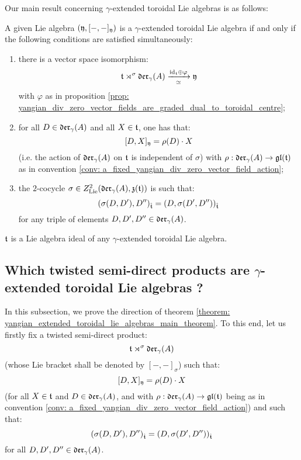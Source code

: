         Our main result concerning $\gamma$-extended toroidal Lie algebras is as follows:
        \begin{theorem} \label{theorem: yangian_extended_toroidal_lie_algebras_main_theorem}
            A given Lie algebra $(\mathfrak{y}, [-, -]_{\mathfrak{y}})$ is a $\gamma$-extended toroidal Lie algebra if and only if the following conditions are satisfied simultaneously:
            \begin{enumerate}
                \item there is a vector space isomorphism:
                    $$\mathfrak{t} \rtimes^{\sigma} \mathfrak{der}_{\gamma}(A) \xrightarrow[\simeq]{\mathrm{id}_{\mathfrak{t}} \oplus \varphi} \mathfrak{y}$$
                with $\varphi$ as in proposition \ref{prop: yangian_div_zero_vector_fields_are_graded_dual_to_toroidal_centre};
                \item for all $D \in \mathfrak{der}_{\gamma}(A)$ and all $X \in \mathfrak{t}$, one has that:
                    $$[D, X]_{\mathfrak{y}} = \rho(D) \cdot X$$
                (i.e. the action of $\mathfrak{der}_{\gamma}(A)$ on $\mathfrak{t}$ is independent of $\sigma$) with $\rho: \mathfrak{der}_{\gamma}(A) \to \mathfrak{gl}(\mathfrak{t})$ as in convention \ref{conv: a_fixed_yangian_div_zero_vector_field_action};

                \item the $2$-cocycle $\sigma \in Z^2_{\mathrm{Lie}}(\mathfrak{der}_{\gamma}(A), \mathfrak{z}(\mathfrak{t}))$ is such that:
                    $$(\sigma(D, D'), D'')_{\hat{\mathfrak{t}}} = (D, \sigma(D', D''))_{\hat{\mathfrak{t}}}$$
                for any triple of elements $D, D', D'' \in \mathfrak{der}_{\gamma}(A)$. 
            \end{enumerate}
        \end{theorem}
        \begin{corollary}
            $\mathfrak{t}$ is a Lie algebra ideal of any $\gamma$-extended toroidal Lie algebra.
        \end{corollary}

    \subsection{Which twisted semi-direct products are \texorpdfstring{$\gamma$}{}-extended toroidal Lie algebras ?}
    
        In this subsection, we prove the  direction of theorem \ref{theorem: yangian_extended_toroidal_lie_algebras_main_theorem}. To this end, let us firstly fix a twisted semi-direct product:
            $$\mathfrak{t} \rtimes^{\sigma} \mathfrak{der}_{\gamma}(A)$$
        (whose Lie bracket shall be denoted by $[-, -]_{\sigma}$) such that:
            $$[D, X]_{\mathfrak{y}} = \rho(D) \cdot X$$
        (for all $X \in \mathfrak{t}$ and $D \in \mathfrak{der}_{\gamma}(A)$, and with $\rho: \mathfrak{der}_{\gamma}(A) \to \mathfrak{gl}(\mathfrak{t})$ being as in convention \ref{conv: a_fixed_yangian_div_zero_vector_field_action}) and such that:
            $$(\sigma(D, D'), D'')_{\hat{\mathfrak{t}}} = (D, \sigma(D', D''))_{\hat{\mathfrak{t}}}$$
        for all $D, D', D'' \in \mathfrak{der}_{\gamma}(A)$.

